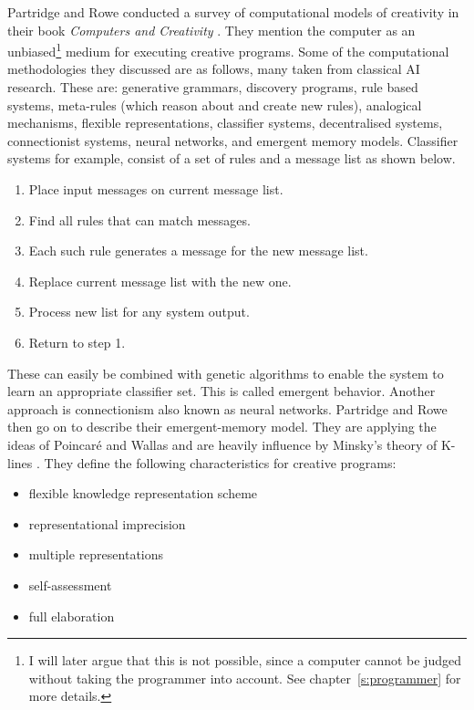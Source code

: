 Partridge and Rowe conducted a survey of computational models of creativity in their book \textit{Computers and Creativity} \autocite*{Partridge1994}. They mention the computer as an unbiased\footnote{I will later argue that this is not possible, since a computer cannot be judged without taking the programmer into account. See chapter~\ref{s:programmer} for more details.} medium for executing creative programs. Some of the computational methodologies they discussed are as follows, many taken from classical \ac{AI} research. These are: generative grammars, discovery programs, rule based systems, meta-rules (which reason about and create new rules), analogical mechanisms, flexible representations, classifier systems, decentralised systems, connectionist systems, neural networks, and emergent memory models. Classifier systems for example, consist of a set of rules and a message list as shown below.

\begin{enumerate}
  \item Place input messages on current message list.
  \item Find all rules that can match messages.
  \item Each such rule generates a message for the new message list.
  \item Replace current message list with the new one.
  \item Process new list for any system output.
  \item Return to step 1.
\end{enumerate}

These can easily be combined with genetic algorithms to enable the system to learn an appropriate classifier set. This is called emergent behavior. Another approach is connectionism also known as neural networks. Partridge and Rowe then go on to describe their emergent-memory model. They are applying the ideas of Poincar{\'e} and Wallas \autocite{Poincare2001,Wallas1926} and are heavily influence by Minsky's theory of K-lines \autocite*{Minsky1980,Minsky1988}. They define the following characteristics for creative programs:

\begin{itemize}
  \item flexible knowledge representation scheme
  \item representational imprecision
  \item multiple representations
  \item self-assessment
  \item full elaboration
\end{itemize}

